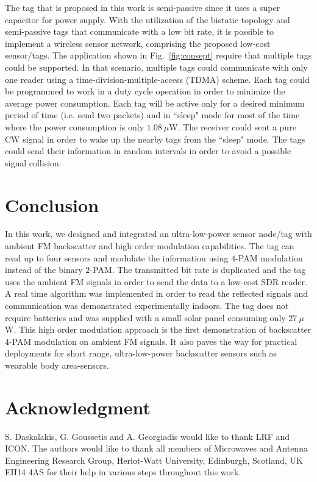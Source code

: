\documentclass[journal]{IEEEtran}
\begin{document}
The tag that is proposed in this work is semi-passive
since it uses a super capacitor for power supply.
%
With the utilization of the bistatic topology and semi-passive tags that communicate with a low bit rate, it is possible to implement a wireless sensor network, comprising the proposed low-cost sensor/tags.
%
The application shown in Fig.~\ref{fig:consept}   require that multiple tags could be supported. 
%
In that scenario, multiple tags could communicate with only one reader using a time-division-multiple-access (TDMA) scheme. 
%
Each tag could be programmed to work in a duty cycle operation in order to minimize the average power consumption.
%
Each  tag will be  active  only for a desired minimum period of time (i.e. send two packets) and  in ``sleep" mode for most of the time where the power consumption  is only $1.08~\mu$W.
%
The receiver could sent a pure CW signal in order to wake up the nearby tags from the ``sleep"  mode.  
%
The tags could send their information in random intervals in order to avoid a possible signal collision. 


\section{Conclusion}
\label{Sec:Conclusion}
%
In this work, we designed and integrated an ultra-low-power sensor node/tag
with ambient FM backscatter and high order modulation capabilities.
%
The tag can read up to four sensors and modulate the information using $4$-PAM modulation instead of the binary $2$-PAM.
%
The transmitted bit rate is duplicated and the tag uses the ambient FM signals in order to send the data to a low-cost SDR reader.
%
A real time algorithm was implemented in order to read the reflected
signals and  communication  was demonstrated experimentally indoors.
%
The tag does not require batteries and was supplied with a small solar panel consuming only $27~\mu$W.
%
This high order modulation approach is the first demonstration of
backscatter $4$-PAM modulation on ambient FM signals.
%
It also paves the way for practical deployments for short range, ultra-low-power backscatter  sensors such as wearable body area-sensors.
%



\section*{Acknowledgment}
\normalsize 

S. Daskalakis, G. Goussetis and A. Georgiadis would like to thank LRF and ICON. The authors would like to thank all members of  Microwaves and Antenna Engineering Research Group, Heriot-Watt University, Edinburgh, Scotland, UK EH14 4AS for their help in various steps throughout this work. 
\end{document}
